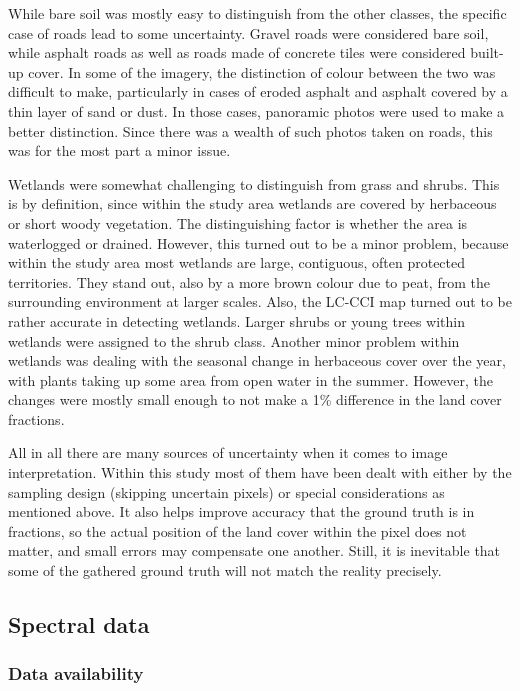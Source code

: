 \documentclass[a4paper,10pt]{book}
\begin{document}
While bare soil was mostly easy to distinguish from the other classes, the specific case of roads lead to some uncertainty. Gravel roads were considered bare soil, while asphalt roads as well as roads made of concrete tiles were considered built-up cover. In some of the imagery, the distinction of colour between the two was difficult to make, particularly in cases of eroded asphalt and asphalt covered by a thin layer of sand or dust. In those cases, panoramic photos were used to make a better distinction. Since there was a wealth of such photos taken on roads, this was for the most part a minor issue.

Wetlands were somewhat challenging to distinguish from grass and shrubs. This is by definition, since within the study area wetlands are covered by herbaceous or short woody vegetation. The distinguishing factor is whether the area is waterlogged or drained. However, this turned out to be a minor problem, because within the study area most wetlands are large, contiguous, often protected territories. They stand out, also by a more brown colour due to peat, from the surrounding environment at larger scales. Also, the LC-CCI map turned out to be rather accurate in detecting wetlands. Larger shrubs or young trees within wetlands were assigned to the shrub class. Another minor problem within wetlands was dealing with the seasonal change in herbaceous cover over the year, with plants taking up some area from open water in the summer. However, the changes were mostly small enough to not make a 1\% difference in the land cover fractions.

All in all there are many sources of uncertainty when it comes to image interpretation. Within this study most of them have been dealt with either by the sampling design (skipping uncertain pixels) or special considerations as mentioned above. It also helps improve accuracy that the ground truth is in fractions, so the actual position of the land cover within the pixel does not matter, and small errors may compensate one another. Still, it is inevitable that some of the gathered ground truth will not match the reality precisely.

\subsection{Spectral data}
\label{sec-spectral}

\subsubsection{Data availability}
\end{document}

